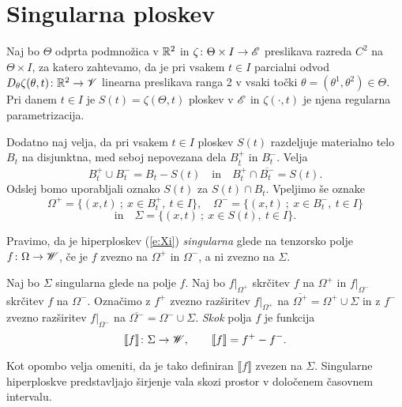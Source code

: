 \section{Singularna ploskev}


Naj bo $\Theta$ odprta podmnožica v $\mathbb R^2$ in $\zeta\colon\Theta\times I\to\mathscr E$ preslikava
razreda $C^2$ na $\Theta\times I$, za katero zahtevamo, da je pri vsakem $t\in I$ parcialni
odvod $D_{\theta}\zeta(\theta,t)\colon\mathbb R^2\to\mathscr V$ linearna preslikava ranga 2
v vsaki točki $\theta=(\theta^1,\theta^2)\in\Theta$. Pri danem $t\in I$ je $S(t)=\zeta(\Theta, t)$ ploskev
v $\mathscr E$ in $\zeta(\cdot, t)$ je njena regularna parametrizacija.

Dodatno naj velja, da pri vsakem $t\in I$ ploskev $S(t)$ razdeljuje materialno telo $B_t$
na disjunktna, med seboj nepovezana dela $B_t^+$ in $B_t^-$. Velja
\[ B_t^+\cup B_t^- = B_t-S(t)\quad\mathrm{in}\quad \overline{B_t^+}\cap \overline{B_t^-}=S(t). \]
Odslej bomo uporabljali oznako $S(t)$ za $S(t)\cap B_t$. Vpeljimo še oznake
\[ \Omega^+=\{(x, t)\: ; \: x\in B_t^+,\ t\in I\},\quad\Omega^-=\{(x, t)\: ; \: x\in B_t^-,\ t\in I\} \]
\begin{equation} \label{e:Xi} \textrm{in}\quad\Sigma = \{(x, t)\: ; \: x\in S(t),\ t\in I\}. \end{equation}

\begin{definicija}
	Pravimo, da je hiperploskev (\ref{e:Xi}) \emph{singularna} glede na tenzorsko polje
	$f\colon\Omega\to\mathscr W$, če je $f$ zvezno na $\Omega^+$ in $\Omega^-$, a ni zvezno na $\Sigma$.
\end{definicija}
\begin{definicija}
	Naj bo $\Sigma$ singularna glede na polje $f$. Naj bo $f|_{\Omega^+}$
	skrčitev $f$ na $\Omega^+$ in $f|_{\Omega^-}$ skrčitev $f$ na $\Omega^-$. Označimo z
	$f^+$ zvezno razširitev $f|_{\Omega^+}$ na $\overline{\Omega^+}=\Omega^+\cup\Sigma$ in z
	$f^-$ zvezno razširitev $f|_{\Omega^-}$ na $\overline{\Omega^-}=\Omega^-\cup\Sigma$. \emph{Skok} polja $f$
	je funkcija
	\[ \llbracket f\rrbracket\colon\Sigma\to\mathscr W,\qquad \llbracket f\rrbracket=f^+-f^-. \]
\end{definicija}
Kot opombo velja omeniti, da je tako definiran $\llbracket f\rrbracket$ zvezen na $\Sigma$.
Singularne hiperploskve predstavljajo širjenje vala skozi prostor v določenem časovnem intervalu.

